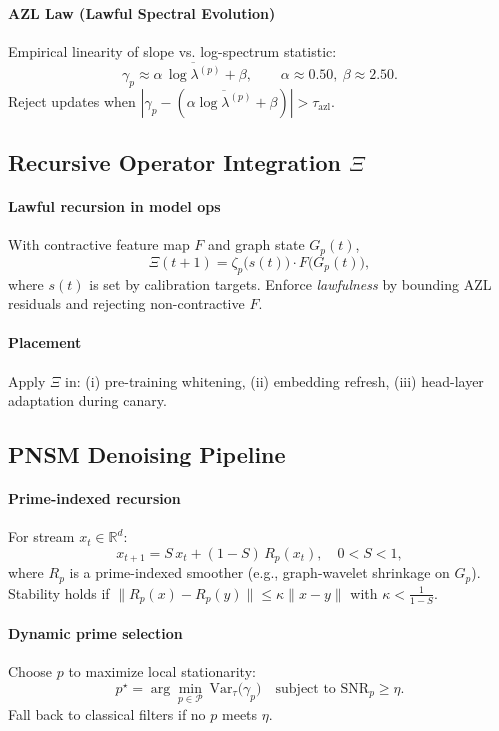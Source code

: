 \documentclass[11pt]{article}
\theoremstyle{plain}
\begin{document}
\paragraph{AZL Law (Lawful Spectral Evolution)}
Empirical linearity of slope vs. log-spectrum statistic:
\[
\gamma_p\approx \alpha\,\overline{\log\lambda^{(p)}}+\beta,
\qquad \alpha\approx 0.50,\ \beta\approx 2.50.
\]
Reject updates when $|\gamma_p-(\alpha\overline{\log\lambda^{(p)}}+\beta)|>\tau_{\text{azl}}$.

\subsection{Recursive Operator Integration \texorpdfstring{$\Xi$}{Xi}}
\paragraph{Lawful recursion in model ops}
With contractive feature map $F$ and graph state $G_p(t)$,
\[
\Xi(t{+}1)=\zeta_p\!\big(s(t)\big)\cdot F\!\big(G_p(t)\big),
\]
where $s(t)$ is set by calibration targets. Enforce \emph{lawfulness} by bounding AZL residuals and rejecting non-contractive $F$.

\paragraph{Placement}
Apply $\Xi$ in: (i) pre-training whitening, (ii) embedding refresh, (iii) head-layer adaptation during canary.

\subsection{PNSM Denoising Pipeline}
\paragraph{Prime-indexed recursion}
For stream $x_t\in\mathbb{R}^d$:
\[
x_{t+1}=S\,x_t+(1{-}S)\,R_p(x_t),\quad 0<S<1,
\]
where $R_p$ is a prime-indexed smoother (e.g., graph-wavelet shrinkage on $G_p$). Stability holds if $\|R_p(x)-R_p(y)\|\le\kappa\|x-y\|$ with $\kappa<\tfrac{1}{1-S}$.

\paragraph{Dynamic prime selection}
Choose $p$ to maximize local stationarity:
\[
p^\star=\arg\min_{p\in\mathcal{P}}\ \mathrm{Var}_\tau\big(\gamma_p\big)\quad \text{subject to } \mathrm{SNR}_p\ge \eta.
\]
Fall back to classical filters if no $p$ meets $\eta$.
\end{document}

